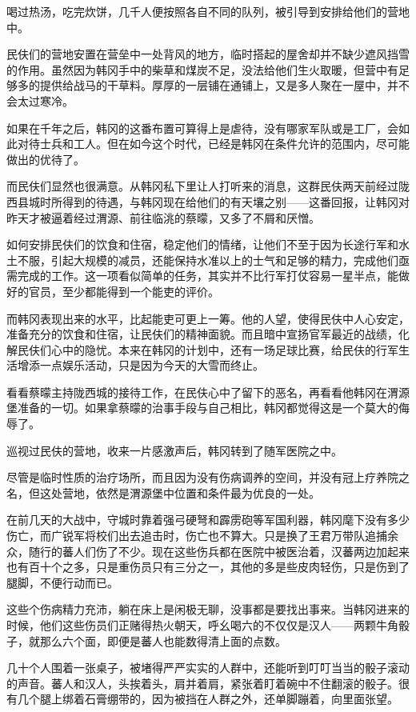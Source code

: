 喝过热汤，吃完炊饼，几千人便按照各自不同的队列，被引导到安排给他们的营地中。

民伕们的营地安置在营垒中一处背风的地方，临时搭起的屋舍却并不缺少遮风挡雪的作用。虽然因为韩冈手中的柴草和煤炭不足，没法给他们生火取暖，但营中有足够多的提供给战马的干草料。厚厚的一层铺在通铺上，又是多人聚在一屋中，并不会太过寒冷。

如果在千年之后，韩冈的这番布置可算得上是虐待，没有哪家军队或是工厂，会如此对待士兵和工人。但在如今这个时代，已经是韩冈在条件允许的范围内，尽可能做出的优待了。

而民伕们显然也很满意。从韩冈私下里让人打听来的消息，这群民伕两天前经过陇西县城时所得到的待遇，与韩冈现在给他们的有天壤之别——这番回报，让韩冈对昨天才被逼着经过渭源、前往临洮的蔡曚，又多了不屑和厌憎。

如何安排民伕们的饮食和住宿，稳定他们的情绪，让他们不至于因为长途行军和水土不服，引起大规模的减员，还能保持水准以上的士气和足够的精力，完成他们亟需完成的工作。这一项看似简单的任务，其实并不比行军打仗容易一星半点，能做好的官员，至少都能得到一个能吏的评价。

而韩冈表现出来的水平，比起能吏可更上一筹。他的人望，使得民伕中人心安定，准备充分的饮食和住宿，让民伕们的精神面貌。而且暗中宣扬官军最近的战绩，化解民伕们心中的隐忧。本来在韩冈的计划中，还有一场足球比赛，给民伕的行军生活增添一点娱乐活动，只是因为今天的大雪而终止。

看看蔡曚主持陇西城的接待工作，在民伕心中了留下的恶名，再看看他韩冈在渭源堡准备的一切。如果拿蔡曚的治事手段与自己相比，韩冈都觉得这是一个莫大的侮辱了。

巡视过民伕的营地，收来一片感激声后，韩冈转到了随军医院之中。

尽管是临时性质的治疗场所，而且因为没有伤病调养的空间，并没有冠上疗养院之名，但这处营地，依然是渭源堡中位置和条件最为优良的一处。

在前几天的大战中，守城时靠着强弓硬弩和霹雳砲等军国利器，韩冈麾下没有多少伤亡，而广锐军将校们出去追击时，伤亡也不算大。只是换了王君万带队追捕余众，随行的蕃人们伤了不少。现在这些伤兵都在医院中被医治着，汉蕃两边加起来也有百十个之多，只是重伤员只有三分之一，其他的多是些皮肉轻伤，只是伤到了腿脚，不便行动而已。

这些个伤病精力充沛，躺在床上是闲极无聊，没事都是要找出事来。当韩冈进来的时候，他们这些伤员们正赌得热火朝天，呼幺喝六的不仅仅是汉人——两颗牛角骰子，就那么六个面，即便是蕃人也能数得清上面的点数。

几十个人围着一张桌子，被堵得严严实实的人群中，还能听到叮叮当当的骰子滚动的声音。蕃人和汉人，头挨着头，肩并着肩，紧张着盯着碗中不住翻滚的骰子。很有几个腿上绑着石膏绷带的，因为被挡在人群之外，还单脚蹦着，向里面张望。

